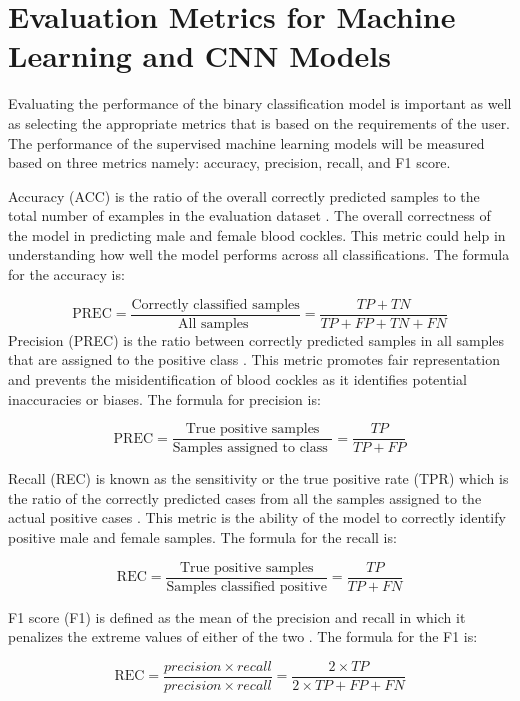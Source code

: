 \section{Evaluation Metrics for Machine Learning and CNN Models}
Evaluating the performance of the binary classification model is important as well as selecting the appropriate metrics that is based on the requirements of the user. The performance of the supervised machine learning models will be measured based on three metrics namely: accuracy, precision, recall, and F1 score. 

Accuracy (ACC) is the ratio of the overall correctly predicted samples to the total number of examples in the evaluation dataset \cite{cui2020}. The overall correctness of the model in predicting male and female blood cockles. This metric could help in understanding how well the model performs across all classifications. The formula for the accuracy is: 

\begin{equation}
	\text{PREC} = \frac{\text{Correctly classified samples}} {\text{All samples }} = \frac{TP+ TN}{TP + FP + TN + FN}
	\label{eq:acc}
\end{equation}
Precision (PREC) is the ratio between correctly predicted samples in all samples that are assigned to the positive class \cite{cui2020}. This metric promotes fair representation and prevents the misidentification of blood cockles as it identifies potential inaccuracies or biases. The formula for precision is:


\begin{equation}
	\text{PREC} = \frac{\text{True positive samples}} {\text{Samples assigned to class }} = \frac{TP}{TP + FP}
	\label{eq:prec}
\end{equation}

Recall (REC) is known as the sensitivity or the true positive rate (TPR) which is the ratio of the correctly predicted cases from all the samples assigned to the actual positive cases \cite{cui2020}. This metric is the ability of the model to correctly identify positive male and female samples. The formula for the recall is:

\begin{equation}
	\text{REC} = \frac{\text{True positive samples}} {\text{Samples classified positive}} = \frac{TP}{TP + FN}
	\label{eq:rec}
\end{equation}

F1 score (F1) is defined as the mean of the precision and recall in which it penalizes the extreme values of either of the two \cite{cui2020}. The formula for the F1 is: 

\begin{equation}
	\text{REC} = \frac{ precision \times recall }{precision \times recall }= \frac{2 \times TP}{2 \times TP + FP + FN}
	\label{eq:f1}
\end{equation}
